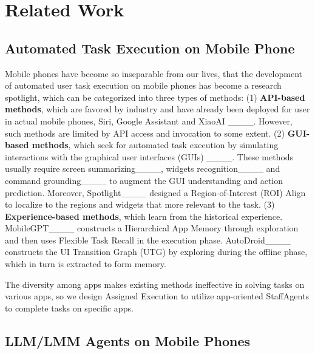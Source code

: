 \section{Related Work}
\subsection{Automated Task Execution on Mobile Phone}

Mobile phones have become so inseparable from our lives, that the development of automated user task execution on mobile phones has become a research spotlight, which can be categorized into three types of methods:
(1) \textbf{API-based methods}, which are favored by industry and have already been deployed for user in actual mobile phones, \eg Siri, Google Assistant and XiaoAI ____. However, such methods are limited by API access and invocation to some extent.
(2) \textbf{GUI-based methods}, which seek for automated task execution by simulating interactions with the graphical user interfaces (GUIs) ____. These methods usually require screen summarizing____, widgets recognition____ and command grounding____ to augment the GUI understanding and action prediction. Moreover, Spotlight____ designed a Region-of-Interest (ROI) Align to localize to the regions and widgets that more relevant to the task.
(3) \textbf{Experience-based methods}, which learn from the historical experience. MobileGPT____ constructs a Hierarchical App Memory through exploration and then uses Flexible Task Recall in the execution phase. AutoDroid____ constructs the UI Transition Graph (UTG) by exploring during the offline phase, which in turn is extracted to form memory.

The diversity among apps makes existing methods ineffective in solving tasks on various apps, so we design Assigned Execution to utilize app-oriented StaffAgents to complete tasks on specific apps.

\subsection{LLM/LMM Agents on Mobile Phones}

